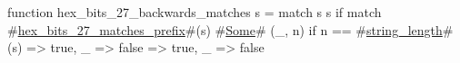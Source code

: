 function hex_bits_27_backwards_matches s = match s {
  s if match #\hyperref[sailRISCVzhexzybitszy27zymatcheszyprefix]{hex\_bits\_27\_matches\_prefix}#(s) {
    #\hyperref[sailRISCVzSome]{Some}# (_, n) if n == #\hyperref[sailRISCVzstringzylength]{string\_length}#(s) => true,
    _ => false
  } => true,
  _ => false
}
